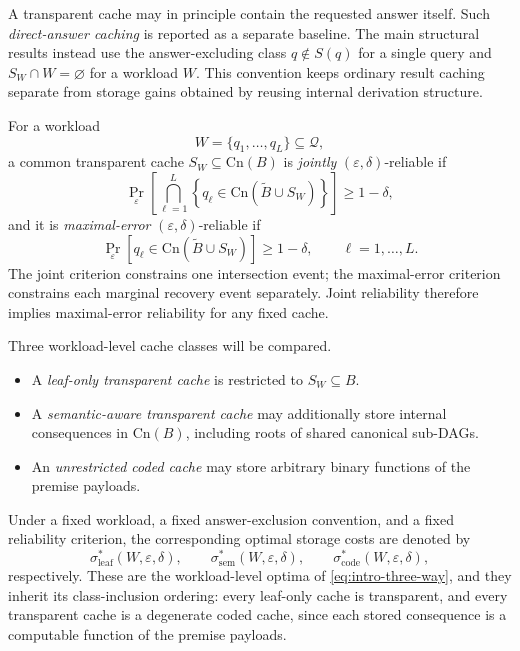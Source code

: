 \documentclass[journal]{IEEEtran}
\newcommand{\Cn}{\text{Cn}}
\numberwithin{equation}{section}
\begin{document}
A transparent cache may in principle contain the requested answer itself.
Such \emph{direct-answer caching} is reported as a separate baseline.  The
main structural results instead use the answer-excluding class
\(q\notin S(q)\) for a single query and \(S_W\cap W=\varnothing\) for a
workload \(W\).  This convention keeps ordinary result caching separate
from storage gains obtained by reusing internal derivation structure.

For a workload
\[
  W=\{q_1,\ldots,q_L\}\subseteq\mathcal Q,
\]
a common transparent cache \(S_W\subseteq\Cn(B)\) is \emph{jointly}
\((\varepsilon,\delta)\)-reliable if
\begin{equation}
  \Pr_{\varepsilon}\!\left[
    \bigcap_{\ell=1}^{L}
    \left\{
      q_\ell\in\Cn(\widetilde B\cup S_W)
    \right\}
  \right]
  \ge 1-\delta,
\label{eq:model-joint-criterion}
\end{equation}
and it is \emph{maximal-error} \((\varepsilon,\delta)\)-reliable if
\begin{equation}
  \Pr_{\varepsilon}\!\left[
    q_\ell\in\Cn(\widetilde B\cup S_W)
  \right]
  \ge 1-\delta,
  \qquad \ell=1,\ldots,L.
\label{eq:model-max-criterion}
\end{equation}
The joint criterion constrains one intersection event; the maximal-error
criterion constrains each marginal recovery event separately.  Joint
reliability therefore implies maximal-error reliability for any fixed cache.

Three workload-level cache classes will be compared.

\begin{itemize}[leftmargin=5mm]
\item A \emph{leaf-only transparent cache} is restricted to \(S_W\subseteq B\).

\item A \emph{semantic-aware transparent cache} may additionally store internal
consequences in \(\Cn(B)\), including roots of shared canonical sub-DAGs.

\item An \emph{unrestricted coded cache} may store arbitrary binary functions
of the premise payloads.
\end{itemize}

Under a fixed workload, a fixed answer-exclusion convention, and a fixed
reliability criterion, the corresponding optimal storage costs are denoted by
\[
  \sigma_{\mathrm{leaf}}^*(W,\varepsilon,\delta),\qquad
  \sigma_{\mathrm{sem}}^*(W,\varepsilon,\delta),\qquad
  \sigma_{\mathrm{code}}^*(W,\varepsilon,\delta),
\]
respectively.  These are the workload-level optima of
\eqref{eq:intro-three-way}, and they inherit its class-inclusion ordering:
every leaf-only cache is transparent, and every transparent cache is a
degenerate coded cache, since each stored consequence is a computable
function of the premise payloads.
\end{document}
